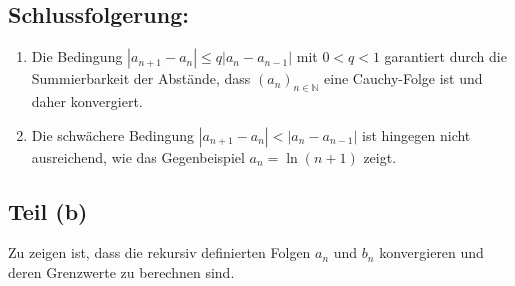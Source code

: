\documentclass[11pt]{article}
\begin{document}
\subsection*{Schlussfolgerung:}
\begin{enumerate}
    \item Die Bedingung \( |a_{n+1} - a_n| \leq q |a_n - a_{n-1}| \) mit \( 0 < q < 1 \) garantiert durch die Summierbarkeit der Abstände, dass \( (a_n)_{n \in \mathbb{N}} \) eine Cauchy-Folge ist und daher konvergiert.
    \item Die schwächere Bedingung \( |a_{n+1} - a_n| < |a_n - a_{n-1}| \) ist hingegen nicht ausreichend, wie das Gegenbeispiel \( a_n = \ln(n+1) \) zeigt.
\end{enumerate}
\subsection*{Teil (b)}
Zu zeigen ist, dass die rekursiv definierten Folgen $a_n$ und $b_n$ konvergieren und deren Grenzwerte zu berechnen sind.
\end{document}
